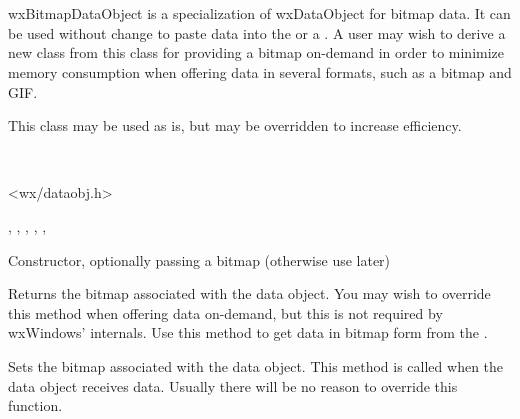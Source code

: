 \section{}\label{wxbitmapdataobject}

wxBitmapDataObject is a specialization of wxDataObject for bitmap data. It can
be used without change to paste data into the
 or a . A
user may wish to derive a new class from this class for providing a bitmap
on-demand in order to minimize memory consumption when offering data in several
formats, such as a bitmap and GIF.



This class may be used as is, but
 may be overridden to increase
efficiency.


\\


<wx/dataobj.h>


,
,
,
,
,


Constructor, optionally passing a bitmap (otherwise use
 later)

\label{wxbitmapdataobjectgetbitmap}


Returns the bitmap associated with the data object. You may wish to override
this method when offering data on-demand, but this is not required by
wxWindows' internals. Use this method to get data in bitmap form from
the .

\label{wxbitmapdataobjectsetbitmap}


Sets the bitmap associated with the data object. This method is called when the
data object receives data. Usually there will be no reason to override this
function.

